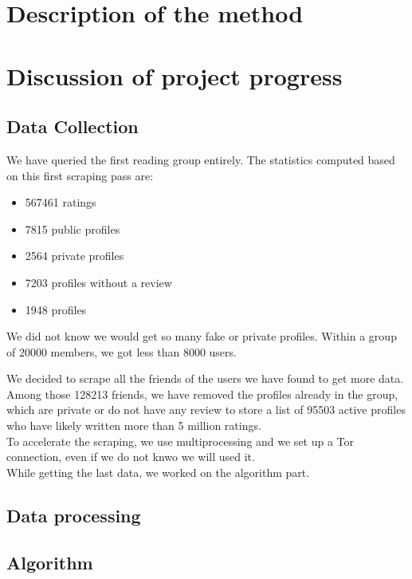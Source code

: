 \documentclass[11pt]{article}
\begin{document}
\section{Description of the method}


\section{Discussion of project progress}
\subsection{Data Collection}

We have queried the first reading group entirely.
The statistics computed based on this first scraping pass are:
\begin{itemize}
\item 567461 ratings
\item 7815 public profiles
\item 2564 private profiles
\item 7203 profiles without a review
\item 1948 profiles 
\end{itemize}

We did not know we would get so many fake or private profiles. Within a group of 20000 members, we got less than 8000 users.

We decided to scrape all the friends of the users we have found to get more data. 
Among those 128213 friends, we have removed the profiles already in the group, which are private or do not have any review to store a list of 95503 active profiles who have likely written more than 5 million ratings.\\

To accelerate the scraping, we use multiprocessing and we set up a Tor connection, even if we do not knwo we will used it.\\
While getting the last data, we worked on the algorithm part.

\subsection{Data processing}

\subsection{Algorithm}
\end{document}
